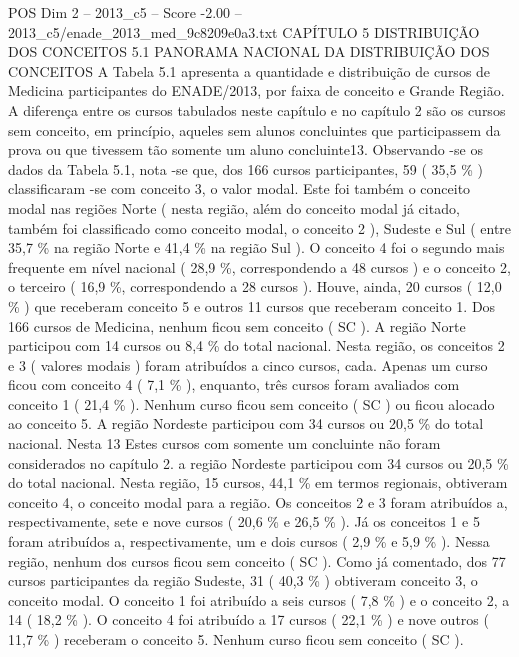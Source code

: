 \begin{textsample}{POS Dim 2 – 2013\_c5 – Score -2.00 – 2013\_c5/enade\_2013\_med\_9c8209e0a3.txt}  \label{ex:f2_pos_370}
CAPÍTULO 5 DISTRIBUIÇÃO DOS CONCEITOS 5.1 PANORAMA NACIONAL DA DISTRIBUIÇÃO DOS CONCEITOS A Tabela 5.1 apresenta a quantidade e distribuição de cursos de Medicina participantes do ENADE/2013, por faixa de conceito e Grande Região.
A diferença entre os cursos tabulados neste capítulo e no capítulo 2 são os cursos sem conceito, em princípio, aqueles sem alunos concluintes que participassem da prova ou que tivessem tão somente um aluno concluinte13.
Observando -se os dados da Tabela 5.1, nota -se que, dos 166 cursos participantes, 59 ( 35,5 \% ) classificaram -se com conceito 3, o valor modal.
Este foi também o conceito modal nas regiões Norte ( nesta região, além do conceito modal já citado, também foi classificado como conceito modal, o conceito 2 ), Sudeste e Sul ( entre 35,7 \% na região Norte e 41,4 \% na região Sul ).
O conceito 4 foi o segundo mais frequente em nível nacional ( 28,9 \%, correspondendo a 48 cursos ) e o conceito 2, o terceiro ( 16,9 \%, correspondendo a 28 cursos ).
Houve, ainda, 20 cursos ( 12,0 \% ) que receberam conceito 5 e outros 11 cursos que receberam conceito 1.
Dos 166 cursos de Medicina, nenhum ficou sem conceito ( SC ).
A região Norte participou com 14 cursos ou 8,4 \% do total nacional.
Nesta região, os conceitos 2 e 3 ( valores modais ) foram atribuídos a cinco cursos, cada.
Apenas um curso ficou com conceito 4 ( 7,1 \% ), enquanto, três cursos foram avaliados com conceito 1 ( 21,4 \% ).
Nenhum curso ficou sem conceito ( SC ) ou ficou alocado ao conceito 5.
A região Nordeste participou com 34 cursos ou 20,5 \% do total nacional.
Nesta 13 Estes cursos com somente um concluinte não foram considerados no capítulo 2. a região Nordeste participou com 34 cursos ou 20,5 \% do total nacional.
Nesta região, 15 cursos, 44,1 \% em termos regionais, obtiveram conceito 4, o conceito modal para a região.
Os conceitos 2 e 3 foram atribuídos a, respectivamente, sete e nove cursos ( 20,6 \% e 26,5 \% ).
Já os conceitos 1 e 5 foram atribuídos a, respectivamente, um e dois cursos ( 2,9 \% e 5,9 \% ).
Nessa região, nenhum dos cursos ficou sem conceito ( SC ).
Como já comentado, dos 77 cursos participantes da região Sudeste, 31 ( 40,3 \% ) obtiveram conceito 3, o conceito modal.
O conceito 1 foi atribuído a seis cursos ( 7,8 \% ) e o conceito 2, a 14 ( 18,2 \% ).
O conceito 4 foi atribuído a 17 cursos ( 22,1 \% ) e nove outros ( 11,7 \% ) receberam o conceito 5.
Nenhum curso ficou sem conceito ( SC ).

\end{textsample}
